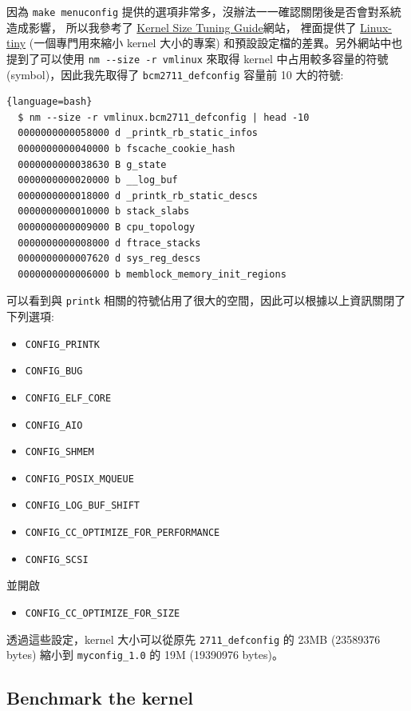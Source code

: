 \documentclass[a4paper, oneside, final, 12pt]{scrartcl} %
\begin{document}
因為 \lstinline{make menuconfig} 提供的選項非常多，沒辦法一一確認關閉後是否會對系統造成影響，
所以我參考了 \href{https://elinux.org/Kernel_Size_Tuning_Guide}{Kernel Size Tuning Guide}網站，
裡面提供了 \href{https://elinux.org/Linux_Tiny}{Linux-tiny} (一個專門用來縮小 kernel 大小的專案)
和預設設定檔的差異。另外網站中也提到了可以使用 \lstinline{nm --size -r vmlinux} 
來取得 kernel 中占用較多容量的符號 (symbol)，因此我先取得了 \lstinline{bcm2711_defconfig}
容量前 10 大的符號:

\begin{lstlisting}{language=bash}
  $ nm --size -r vmlinux.bcm2711_defconfig | head -10
  0000000000058000 d _printk_rb_static_infos
  0000000000040000 b fscache_cookie_hash
  0000000000038630 B g_state
  0000000000020000 b __log_buf
  0000000000018000 d _printk_rb_static_descs
  0000000000010000 b stack_slabs
  0000000000009000 B cpu_topology
  0000000000008000 d ftrace_stacks
  0000000000007620 d sys_reg_descs
  0000000000006000 b memblock_memory_init_regions
\end{lstlisting}


可以看到與 \lstinline{printk} 相關的符號佔用了很大的空間，因此可以根據以上資訊關閉了下列選項:

\begin{itemize}
  \item \lstinline{CONFIG_PRINTK}
  \item \lstinline{CONFIG_BUG}
  \item \lstinline{CONFIG_ELF_CORE}
  \item \lstinline{CONFIG_AIO}
  \item \lstinline{CONFIG_SHMEM}
  \item \lstinline{CONFIG_POSIX_MQUEUE}
  \item \lstinline{CONFIG_LOG_BUF_SHIFT}
  \item \lstinline{CONFIG_CC_OPTIMIZE_FOR_PERFORMANCE}
  \item \lstinline{CONFIG_SCSI}
\end{itemize}

並開啟

\begin{itemize}
  \item \lstinline{CONFIG_CC_OPTIMIZE_FOR_SIZE}
\end{itemize}

透過這些設定，kernel 大小可以從原先 \lstinline{2711_defconfig} 的 23MB (23589376 bytes)
縮小到 \lstinline{myconfig_1.0} 的 19M (19390976 bytes)。

\subsection{Benchmark the kernel}
\end{document}
